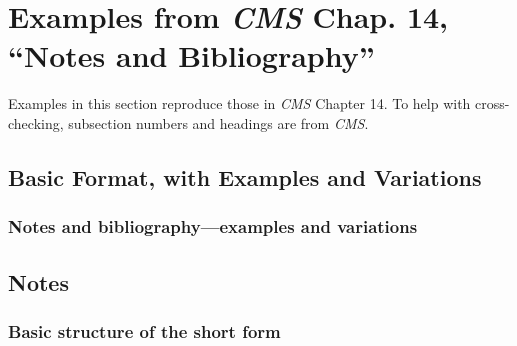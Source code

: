 \documentclass[11pt,letterpaper,oneside]{article}
\begin{document}
\section{Examples from \emph{CMS} Chap. 14, ``Notes and
Bibliography''}
\label{notes}

Examples in this section reproduce those in \textit{CMS} Chapter 14.
To help with cross-checking, subsection numbers and headings are from
\textit{CMS}.

\subsection{Basic Format, with Examples and Variations}
\setcounter{subsection}{14}

\setcounter{subsubsection}{22}
\subsubsection{Notes and bibliography—examples and variations}
\label{14.23}

\begin{citebib}
\item \cite[87-88]{strayed2012}
\item \cite[261, 265]{strayed2012}
\item \cite[32]{daum2015}
\item \cite[134--35]{daum2015}
\item \cite[188]{grazer2015}
\item \cite[190]{grazer2015}
\item \cite[242--55]{garcia1988}
\item \cite[33]{garcia1988}
\item \cite[310]{gould1984a}
\item \cite[309]{gould1984a}
\item \cite[484--85]{bagley2015}
\item \cite[501]{bagley2015}
\item \cite[311]{liu2015}
\item \cite[312]{liu2015}
\end{citebib}

\setcounter{subsection}{1}
\subsection{Notes}
\setcounter{subsection}{14}

\setcounter{subsubsection}{29}
\subsubsection{Basic structure of the short form}
\label{14.30}
\end{document}
